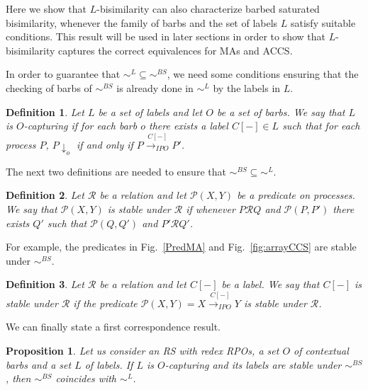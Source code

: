\documentclass[copyright,creativecommons]{eptcs}
\makeatletter
\newcommand{\bisl}{\sim^{L}}
\def\IPOtr#1{\stackrel{#1}{\rightarrowfill_{IPO}}}
\def \rightarrowfill{\m@th\mathord{\smash-}\mkern-6mu\cleaders\hbox{$\mkern-2mu\mathord{\smash-}\mkern-2mu$}\hfill
  \mkern-6mu\mathord\rightarrow}
\newcommand{\barb}[1]{\downarrow_{#1}}
\newcommand{\bsbis}{\sim^{BS}}
\def\IPOtr#1{\stackrel{#1}{\rightarrow_{IPO}}}
\newcommand{\<}{\langle}
\renewcommand{\>}{\rangle}
\def \rightarrowfill{\m@th\mathord{\smash-}\mkern-6mu\cleaders\hbox{$\mkern-2mu\mathord{\smash-}\mkern-2mu$}\hfill
  \mkern-6mu\mathord\rightarrow}
\newtheorem{definition}{Definition}{}
\newtheorem{proposition}{Proposition}{}
\makeatother
\begin{document}
Here we show that $L$-bisimilarity can also characterize barbed
saturated bisimilarity, whenever the family of barbs and the set of
labels $L$ satisfy suitable conditions. This result will be used in
later sections in order to show that $L$-bisimilarity captures the
correct equivalences for MAs and ACCS.

In order to guarantee that $\bisl \subseteq \bsbis$, we need some
conditions ensuring that the checking of barbs of $\bsbis$ is
already done in $\bisl$ by the labels in $L$.
\begin{definition}\label{def:PredCapturing}
Let $L$ be a set of labels and let $O$ be a set of barbs. We say
that $L$ is \emph{$O$-capturing} if for each barb $o$ there exists a
label $C[-] \in L$ such that for each process $P$, $P \barb o$ if and only if
$P \IPOtr{C[-]} P'$.
\end{definition}

The next two definitions are needed to ensure that $\bsbis \subseteq
\bisl$.

\begin{definition}\label{def:PredStable}
Let $\mathcal R$ be a relation and let $\mathcal P(X,Y)$ be a
predicate on processes. We say that $\mathcal P(X,Y)$ is
\emph{stable under $\mathcal R$} if whenever $P \mathcal R Q$ and
$\mathcal P(P,P')$ there exists $Q'$ such that $\mathcal
P(Q,Q')$ and $P' \mathcal R Q'$.
\end{definition}

For example, the predicates in Fig.~\ref{PredMA} and
Fig.~\ref{fig:arrayCCS} are stable under $\bsbis$.

\begin{definition}\label{def:Lstable}
Let $\mathcal R$ be a relation and let $C[-]$ be a label. We say
that $C[-]$ is \emph{stable under $\mathcal R$} if the predicate
$\mathcal P(X,Y)= X \IPOtr{C[-]} Y$ is stable under $\mathcal R$.
\end{definition}

We can finally state a first correspondence result.

\begin{proposition} \label{Prop:BSB=LB} Let us consider an RS with
  redex RPOs, a set $O$ of contextual barbs and a set $L$ of
  labels. If $L$ is $O$-capturing and its labels are stable under
  $\bsbis$, then $\bsbis$ coincides with $\bisl$.
\end{proposition}
\end{document}
